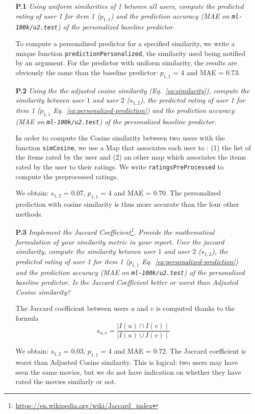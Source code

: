 \documentclass{article}
\begin{document}
  
\begin{itemize}
    \item [\textbf{P.1}] \textit{Using uniform similarities of 1 between all users, compute the predicted rating of user 1 for item 1 ($p_{1,1}$) and the prediction accuracy (MAE on \texttt{ml-100k/u2.test}) of the personalized baseline predictor.} 
    
    To compute a personalized predictor for a specified similarity, we write a unique function \texttt{predictionPersonalized}, the similarity used being notified by an argument. For the predictor with uniform similarity, the results are obviously the same than the baseline predictor: $p_{1,1}$ = 4 and MAE = 0.73.
    
    \item [\textbf{P.2}] \textit{Using the the adjusted cosine similarity (Eq.~\ref{eq:similarity}), compute the similarity between user $1$ and user $2$ ($s_{1,2}$), the predicted rating of user 1 for item 1 ($p_{1,1}$ Eq.~\ref{eq:personalized-prediction}) and the prediction accuracy (MAE on \texttt{ml-100k/u2.test}) of the personalized baseline predictor.} 
    
    In order to compute the Cosine similarity between two users with the function \texttt{simCosine}, we use a Map that associates each user to : (1) the list of the items rated by the user and (2) an other map which associates the items rated by the user to their ratings. We write \texttt{ratingsPreProcessed} to compute the preprocessed ratings.
    
    We obtain: $s_{1,2}$ =  0.07, $p_{1,1}$ = 4 and MAE = 0.70. The personalized prediction with cosine similarity is thus more accurate than the four other methods.
    
        \item [\textbf{P.3}] \textit{Implement the Jaccard Coefficient\footnote{\url{https://en.wikipedia.org/wiki/Jaccard_index}}. Provide the mathematical formulation of your similarity metric in your report. User the jaccard similarity, compute the similarity between user $1$ and user $2$ ($s_{1,2}$), the predicted rating of user 1 for item 1 ($p_{1,1}$ Eq.~\ref{eq:personalized-prediction}) and the prediction accuracy (MAE on \texttt{ml-100k/u2.test}) of the personalized baseline predictor. Is the Jaccard Coefficient better or worst than Adjusted Cosine similarity?}
        
        The Jaccard coefficient between users $u$ and $v$ is computed thanks to the formula $$ s_{u,v} = \frac{\mid I(u) \cap I(v)\mid}{\mid I(u) \cup I(v)\mid}$$
        
        We obtain: $s_{1,2}$ =  0.03, $p_{1,1}$ = 4 and MAE = 0.72. The Jaccard coefficient is worst than Adjusted Cosine similarity. This is logical: two users may have seen the same movies, but we do not have indication on whether they have rated the movies similarly or not.
        
        
\end{itemize}
\end{document}
